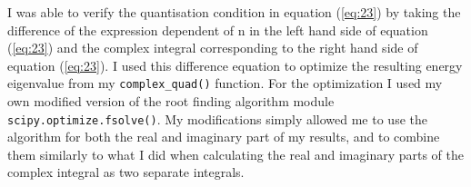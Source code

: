 \documentclass[10pt, a4paper, singlespacing]{report}
\begin{document}
I was able to verify the quantisation condition in equation (\ref{eq:23}) by taking the difference of the expression dependent of n in the left hand side of equation (\ref{eq:23}) and the complex integral corresponding to the right hand side of equation (\ref{eq:23}).
I used this difference equation to optimize the resulting energy eigenvalue from my \texttt{complex\_quad()} function. For the optimization I used my own modified version of the root finding algorithm module \texttt{scipy.optimize.fsolve()}. My modifications simply allowed me to use the algorithm for both the real and imaginary part of my results, and to combine them similarly to what I did when calculating the real and imaginary parts of the complex integral as two separate integrals.
\end{document}
